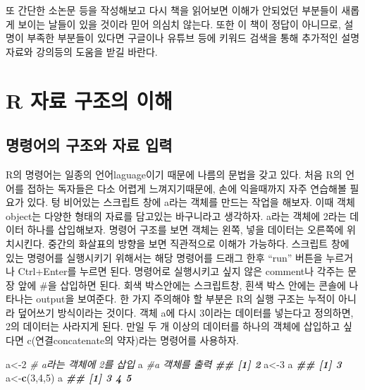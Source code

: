 \documentclass[
]{book}
\newenvironment{Shaded}{\begin{snugshade}}{\end{snugshade}}
\newcommand{\CommentTok}[1]{\textcolor[rgb]{0.56,0.35,0.01}{\textit{#1}}}
\newcommand{\DecValTok}[1]{\textcolor[rgb]{0.00,0.00,0.81}{#1}}
\newcommand{\DocumentationTok}[1]{\textcolor[rgb]{0.56,0.35,0.01}{\textbf{\textit{#1}}}}
\newcommand{\FunctionTok}[1]{\textcolor[rgb]{0.13,0.29,0.53}{\textbf{#1}}}
\newcommand{\NormalTok}[1]{#1}
\newcommand{\OtherTok}[1]{\textcolor[rgb]{0.56,0.35,0.01}{#1}}
\begin{document}
또 간단한 소논문 등을 작성해보고 다시 책을 읽어보면 이해가 안되었던 부분들이 새롭게 보이는 날들이 있을 것이라 믿어 의심치 않는다. 또한 이 책이 정답이 아니므로, 설명이 부족한 부분들이 있다면 구글이나 유튜브 등에 키워드 검색을 통해 추가적인 설명자료와 강의등의 도움을 받길 바란다.

\chapter{R 자료 구조의 이해}\label{data}

\section{명령어의 구조와 자료 입력}\label{uxba85uxb839uxc5b4uxc758-uxad6cuxc870uxc640-uxc790uxb8cc-uxc785uxb825}

R의 명령어는 일종의 언어laguage이기 때문에 나름의 문법을 갖고 있다. 처음 R의 언어를 접하는 독자들은 다소 어렵게 느껴지기때문에, 손에 익을때까지 자주 연습해볼 필요가 있다. 텅 비어있는 스크립트 창에 a라는 객체를 만드는 작업을 해보자. 이때 객체object는 다양한 형태의 자료를 담고있는 바구니라고 생각하자. a라는 객체에 2라는 데이터 하나를 삽입해보자. 명령어 구조를 보면 객체는 왼쪽, 넣을 데이터는 오른쪽에 위치시킨다. 중간의 화살표의 방향을 보면 직관적으로 이해가 가능하다. 스크립트 창에 있는 명령어를 실행시키기 위해서는 해당 명령어를 드래그 한후 ``run'' 버튼을 누르거나 Ctrl+Enter를 누르면 된다. 명령어로 실행시키고 싶지 않은 comment나 각주는 문장 앞에 \#을 삽입하면 된다. 회색 박스안에는 스크립트창, 흰색 박스 안에는 콘솔에 나타나는 output을 보여준다. 한 가지 주의해야 할 부분은 R의 실행 구조는 누적이 아니라 덮어쓰기 방식이라는 것이다. 객체 a에 다시 3이라는 데이터를 넣는다고 정의하면, 2의 데이터는 사라지게 된다. 만일 두 개 이상의 데이터를 하나의 객체에 삽입하고 싶다면 c(연결concatenate의 약자)라는 명령어를 사용하자.

\begin{Shaded}
\begin{Highlighting}[]
\NormalTok{a}\OtherTok{\textless{}{-}}\DecValTok{2} \CommentTok{\# a라는 객체에 2를 삽입}
\NormalTok{a }\CommentTok{\#a 객체를 출력}
\DocumentationTok{\#\# [1] 2}
\NormalTok{a}\OtherTok{\textless{}{-}}\DecValTok{3} 
\NormalTok{a}
\DocumentationTok{\#\# [1] 3}
\NormalTok{a}\OtherTok{\textless{}{-}}\FunctionTok{c}\NormalTok{(}\DecValTok{3}\NormalTok{,}\DecValTok{4}\NormalTok{,}\DecValTok{5}\NormalTok{)}
\NormalTok{a}
\DocumentationTok{\#\# [1] 3 4 5}
\end{Highlighting}
\end{Shaded}
\end{document}

